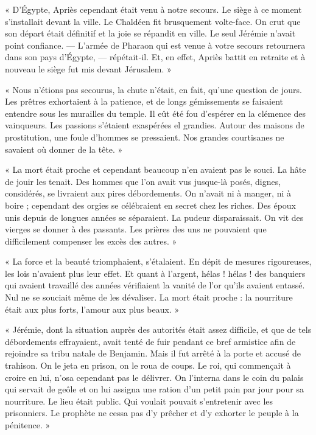 \documentclass[a4paper, 11pt, oneside, polutonikogreek, french]{article}
\begin{document}
« D'Égypte, Apriès cependant était venu à notre secours. Le siège à ce moment s'installait devant la ville. Le Chaldéen fit brusquement volte-face. On crut que son départ était définitif et la joie se répandit en ville. Le seul Jérémie n'avait point confiance. --- L'armée de Pharaon qui est venue à votre secours retournera dans son pays d'Égypte, --- répétait-il. Et, en effet, Apriès battit en retraite et à nouveau le siège fut mis devant Jérusalem. »

« Nous n'étions pas secourus, la chute n'était, en fait, qu'une question de jours. Les prêtres exhortaient à la patience, et de longs gémissements se faisaient entendre sous les murailles du temple. Il eût été fou d'espérer en la clémence des vainqueurs. Les passions s'étaient exaspérées el grandies. Autour des maisons de prostitution, une foule d'hommes se pressaient. Nos grandes courtisanes ne savaient où donner de la tête. »

« La mort était proche et cependant beaucoup n'en avaient pas le souci. La hâte de jouir les tenait. Des hommes que l'on avait vus jusque-là posés, dignes, considérés, se livraient aux pires débordements. On n'avait ni à manger, ni à boire ; cependant des orgies se célébraient en secret chez les riches. Des époux unis depuis de longues années se séparaient. La pudeur disparaissait. On vit des vierges se donner à des passants. Les prières des uns ne pouvaient que difficilement compenser les excès des autres. »

« La force et la beauté triomphaient, s'étalaient. En dépit de mesures rigoureuses, les lois n'avaient plus leur effet. Et quant à l'argent, hélas ! hélas ! des banquiers qui avaient travaillé des années vérifiaient la vanité de l'or qu'ils avaient entassé. Nul ne se souciait même de les dévaliser. La mort était proche : la nourriture était aux plus forts, l'amour aux plus beaux. »

« Jérémie, dont la situation auprès des autorités était assez difficile, et que de tels débordements effrayaient, avait tenté de fuir pendant ce bref armistice afin de rejoindre sa tribu natale de Benjamin. Mais il fut arrêté à la porte et accusé de trahison. On le jeta en prison, on le roua de coups. Le roi, qui commençait à croire en lui, n'osa cependant pas le délivrer. On l'interna dans le coin du palais qui servait de geôle et on lui assigna une ration d'un petit pain par jour pour sa nourriture. Le lieu était public. Qui voulait pouvait s'entretenir avec les prisonniers. Le prophète ne cessa pas d'y prêcher et d'y exhorter le peuple à la pénitence. »
\end{document}
